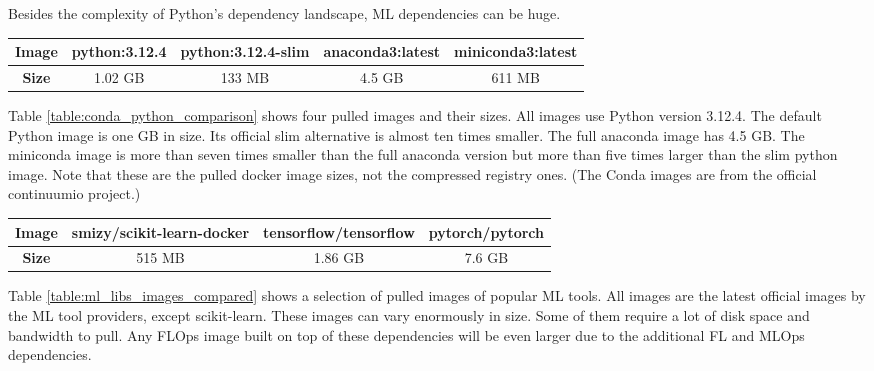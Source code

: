 Besides the complexity of Python's dependency landscape, ML dependencies can be huge.
\begin{changemargin}{0cm}{0cm}
    \centering
    \begin{tabular}{|c||c|c|c|c|}
        \hline
            \textbf{Image} & python:3.12.4 & python:3.12.4-slim & anaconda3:latest & miniconda3:latest \\
        \hline
            \textbf{Size} & 1.02 GB & 133 MB & 4.5 GB & 611 MB
        \\
        \hline
    \end{tabular}
    \label{table:conda_python_comparison}
\end{changemargin}

Table \ref{table:conda_python_comparison} shows four pulled images and their sizes.
All images use Python version 3.12.4.
The default Python image is one GB in size.
Its official slim alternative is almost ten times smaller.
The full anaconda image has 4.5 GB.
The miniconda image is more than seven times smaller than the full anaconda version but more than five times larger than the slim python image.
Note that these are the pulled docker image sizes, not the compressed registry ones.
(The Conda images are from the official continuumio project.)

\begin{changemargin}{0cm}{0cm}
    \centering
    \begin{tabular}{|c||c|c|c|}
        \hline
            \textbf{Image} & smizy/scikit-learn-docker & tensorflow/tensorflow & pytorch/pytorch \\
        \hline
            \textbf{Size} & 515 MB & 1.86 GB & 7.6 GB
        \\
        \hline
    \end{tabular}
    \label{table:ml_libs_images_compared}
\end{changemargin}

Table \ref{table:ml_libs_images_compared} shows a selection of pulled images of popular ML tools.
All images are the latest official images by the ML tool providers, except scikit-learn.
These images can vary enormously in size.
Some of them require a lot of disk space and bandwidth to pull.
Any FLOps image built on top of these dependencies will be even larger due to the additional FL and MLOps dependencies.
